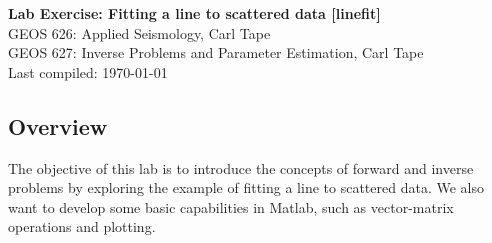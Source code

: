 \documentclass[11pt,titlepage,fleqn]{article}
\begin{document}

\begin{spacing}{1.2}
\centering
{\large \bf Lab Exercise: Fitting a line to scattered data [linefit]} \\
GEOS 626: Applied Seismology, Carl Tape \\
GEOS 627: Inverse Problems and Parameter Estimation, Carl Tape \\
Last compiled: \today
\end{spacing}


\subsection*{Overview}

The objective of this lab is to introduce the concepts of forward and inverse problems by exploring the example of fitting a line to scattered data. We also want to develop some basic capabilities in Matlab, such as vector-matrix operations and plotting.
\end{document}
